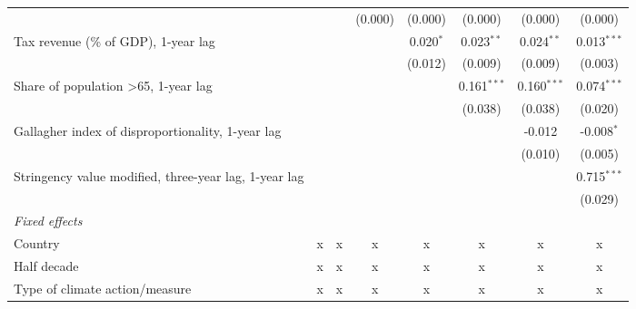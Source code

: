 \begin{tabular}{lccccccc}
                                                                       &         &              & (0.000)       & (0.000)       & (0.000)        & (0.000)        & (0.000)\\   
   Tax revenue (\% of GDP), 1-year lag                                 &         &              &               & 0.020$^{*}$   & 0.023$^{**}$   & 0.024$^{**}$   & 0.013$^{***}$\\   
                                                                       &         &              &               & (0.012)       & (0.009)        & (0.009)        & (0.003)\\   
   Share of population >65, 1-year lag                                 &         &              &               &               & 0.161$^{***}$  & 0.160$^{***}$  & 0.074$^{***}$\\   
                                                                       &         &              &               &               & (0.038)        & (0.038)        & (0.020)\\   
   Gallagher index of disproportionality, 1-year lag                   &         &              &               &               &                & -0.012         & -0.008$^{*}$\\   
                                                                       &         &              &               &               &                & (0.010)        & (0.005)\\   
   Stringency value modified, three-year lag, 1-year lag               &         &              &               &               &                &                & 0.715$^{***}$\\   
                                                                       &         &              &               &               &                &                & (0.029)\\   
   \emph{Fixed effects}\\
   Country                                                             & x       & x            & x             & x             & x              & x              & x\\  
   Half decade                                                         & x       & x            & x             & x             & x              & x              & x\\  
   Type of climate action/measure                                      & x       & x            & x             & x             & x              & x              & x\\  

\end{tabular}
